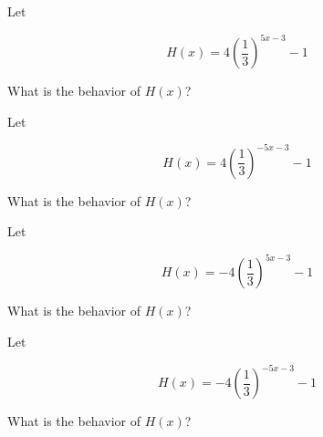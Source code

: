 \documentclass{ximera}
\author{Lee Wayand}
\begin{document}
\begin{exercise}


\begin{question}



Let 

\[
H(x) = 4 \left(\frac{1}{3}\right)^{5x - 3} - 1
\]


What is the behavior of $H(x)$? 


\begin{multipleChoice}
\end{multipleChoice}

\end{question}







\begin{question}



Let 

\[
H(x) = 4 \left(\frac{1}{3}\right)^{-5x - 3} - 1
\]


What is the behavior of $H(x)$? 


\begin{multipleChoice}
\end{multipleChoice}

\end{question}





\begin{question}



Let 

\[
H(x) = -4 \left(\frac{1}{3}\right)^{5x - 3} - 1
\]


What is the behavior of $H(x)$? 


\begin{multipleChoice}
\end{multipleChoice}

\end{question}








\begin{question}



Let 

\[
H(x) = -4 \left(\frac{1}{3}\right)^{-5x - 3} - 1
\]


What is the behavior of $H(x)$? 


\begin{multipleChoice}
\end{multipleChoice}

\end{question}








\end{exercise}
\end{document}
